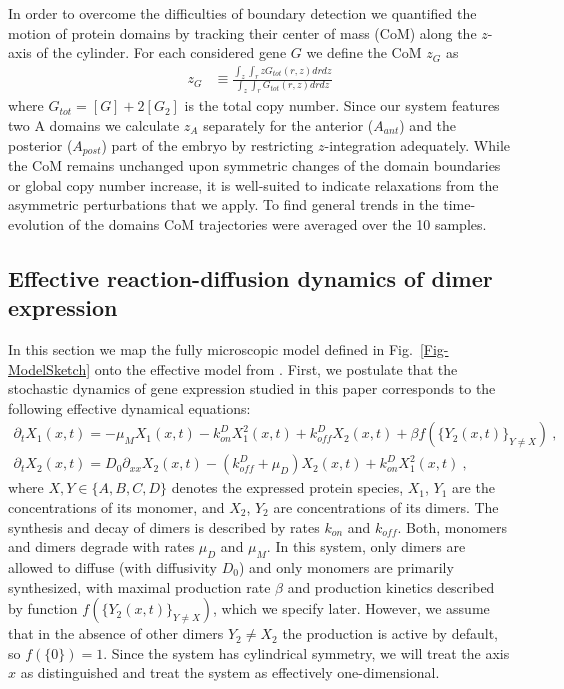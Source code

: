 \documentclass[a4paper,10pt]{article}
\newcommand{\GA}{A\xspace}
\begin{document}
In order to overcome the difficulties of boundary detection we quantified the motion of protein domains
by tracking their center of mass (CoM) along the $z$-axis of the cylinder.
For each considered gene $G$ we define the CoM $z_G$ as
\begin{align}
 z_G &\equiv \frac{\int_z \int_r z G_{tot}(r,z) dr dz }{\int_z \int_r G_{tot}(r,z) dr dz}
\end{align}
where $G_{tot}=[G]+2[G_2]$ is the total copy number.
Since our system features two \GA domains we calculate $z_\GA$ separately for the anterior ($\GA_{ant}$)
and the posterior ($\GA_{post}$) part of the embryo by restricting $z$-integration adequately.
While the CoM remains unchanged upon symmetric changes of the domain boundaries or global copy number increase,
it is well-suited to indicate relaxations from the asymmetric perturbations that we apply.
To find general trends in the time-evolution of the domains CoM trajectories were averaged over the 10 samples.

\subsection*{Effective reaction-diffusion dynamics of dimer expression}

In this section we map the fully microscopic model defined in Fig.~\ref{Fig-ModelSketch} onto the effective model from \cite{Majka2023}. First, we postulate that the stochastic dynamics of gene expression studied in this paper corresponds to the following effective dynamical equations:
\begin{equation}
\begin{gathered}
\partial_t X_1(x,t)=-\mu_M X_1(x,t)-k_{on}^DX_1^2(x,t)+k_{off}^DX_2(x,t)+\beta f(\{Y_2(x,t)\}_{Y\neq X})~,\\
\partial_t X_2(x,t)=D_0\partial_{xx}X_2(x,t)-(k_{off}^D+\mu_D)X_2(x,t)+k_{on}^DX_1^2(x,t)~,
\end{gathered}\label{eq:start}
\end{equation}
where $X,Y\in\{A,B,C,D\}$ denotes the expressed protein species, $X_1$, $Y_1$ are the concentrations of its monomer, and $X_2$, $Y_2$ are concentrations of its dimers. The synthesis and decay of dimers is described by rates $k_{on}$ and $k_{off}$. Both, monomers and dimers degrade with rates $\mu_D$ and $\mu_M$. In this system, only dimers are allowed to diffuse (with diffusivity $D_0$) and only monomers are primarily synthesized, with maximal production rate $\beta$ and production kinetics described by function $f(\{Y_2(x,t)\}_{Y\neq X})$, which we specify later. However, we assume that in the absence of other dimers $Y_2\neq X_2$ the production is active by default, so $f(\{0\})=1$. Since the system has cylindrical symmetry, we will treat the axis $x$ as distinguished and treat the system as effectively one-dimensional.
\end{document}
